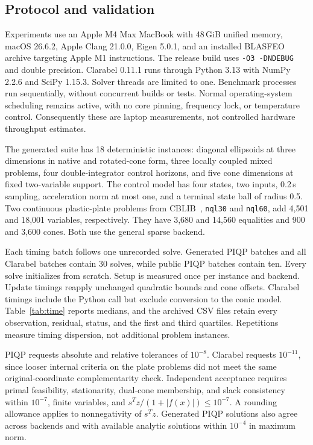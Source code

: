 \subsection{Protocol and validation}
Experiments use an Apple M4 Max MacBook with 48\,GiB unified memory, macOS 26.6.2, Apple Clang 21.0.0, Eigen 5.0.1, and an installed BLASFEO archive targeting Apple M1 instructions. The release build uses \texttt{-O3 -DNDEBUG} and double precision. Clarabel 0.11.1 runs through Python 3.13 with NumPy 2.2.6 and SciPy 1.15.3. Solver threads are limited to one. Benchmark processes run sequentially, without concurrent builds or tests. Normal operating-system scheduling remains active, with no core pinning, frequency lock, or temperature control. Consequently these are laptop measurements, not controlled hardware throughput estimates.

The generated suite has 18 deterministic instances: diagonal ellipsoids at three dimensions in native and rotated-cone form, three locally coupled mixed problems, four double-integrator control horizons, and five cone dimensions at fixed two-variable support. The control model has four states, two inputs, 0.2\,s sampling, acceleration norm at most one, and a terminal state ball of radius 0.5. Two continuous plastic-plate problems from CBLIB~\cite{cblib}, \texttt{nql30} and \texttt{nql60}, add 4,501 and 18,001 variables, respectively. They have 3,680 and 14,560 equalities and 900 and 3,600 cones. Both use the general sparse backend.

Each timing batch follows one unrecorded solve. Generated PIQP batches and all Clarabel batches contain 30 solves, while public PIQP batches contain ten. Every solve initializes from scratch. Setup is measured once per instance and backend. Update timings reapply unchanged quadratic bounds and cone offsets. Clarabel timings include the Python call but exclude conversion to the conic model. Table~\ref{tab:time} reports medians, and the archived CSV files retain every observation, residual, status, and the first and third quartiles. Repetitions measure timing dispersion, not additional problem instances.

PIQP requests absolute and relative tolerances of $10^{-8}$. Clarabel requests $10^{-11}$, since looser internal criteria on the plate problems did not meet the same original-coordinate complementarity check. Independent acceptance requires primal feasibility, stationarity, dual-cone membership, and slack consistency within $10^{-7}$, finite variables, and $s^Tz/(1+|f(x)|)\leq10^{-7}$. A rounding allowance applies to nonnegativity of $s^Tz$. Generated PIQP solutions also agree across backends and with available analytic solutions within $10^{-4}$ in maximum norm.


